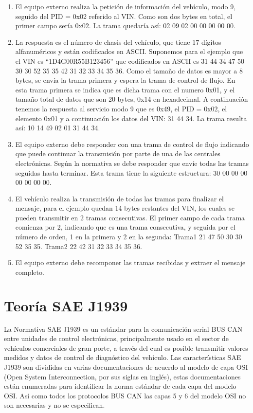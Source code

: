 \begin{enumerate}
\item El equipo externo realiza la petición de información del vehículo, modo 9, seguido del PID = 0x02 referido al VIN. Como son dos bytes en total, el primer campo sería 0x02. La trama quedaría así: 02 09 02 00 00 00 00 00. 
\item La respuesta es el número de chasis del vehículo, que tiene 17 dígitos alfanuméricos y están codificados en ASCII. Suponemos para el ejemplo que el VIN es “1D4G00R55B123456” que codificados en ASCII es 31 44 34 47 50 30 30 52 35 35 42 31 32 33 34 35 36.
Como el tamaño de datos es mayor a 8 bytes, se envía la trama primera y espera la trama de control de flujo. En esta trama primera se indica que es dicha trama con el numero 0x01, y el tamaño total de datos que son 20 bytes, 0x14 en hexadecimal. A continuación tenemos la respuesta al servicio modo 9 que es 0x49, el PID = 0x02, el elemento 0x01 y a continuación los datos del VIN: 31 44 34.
La trama resulta así: 10 14 49 02 01 31 44 34.  
\item El equipo externo debe responder con una trama de control de flujo indicando que puede continuar la transmisión por parte de una de las centrales electrónicas. Según la normativa se debe responder que envíe todas las tramas seguidas hasta terminar. Esta trama tiene la siguiente estructura: 30 00  00 00 00 00 00 00.
\item El vehículo realiza la transmisión de todas las  tramas para finalizar el mensaje, para el ejemplo quedan 14 bytes restantes del VIN, los cuales se pueden transmitir en 2 tramas consecutivas. El primer campo de cada trama comienza por 2, indicando que es una trama consecutiva, y seguida por el número de orden, 1 en la primera y 2 en la segunda:
Trama1 21 47 50 30 30 52 35 35.
Trama2 22 42 31 32 33 34 35 36.
\item El equipo externo debe recomponer las tramas recibidas y extraer el mensaje completo.
\end{enumerate}

\section{Teoría SAE J1939}
La Normativa SAE J1939 es un estándar para la comunicación serial BUS CAN entre unidades de control electrónicas,  principalmente usado en el sector de vehículos comerciales de gran porte, a través del cual es posible transmitir valores medidos y datos de control de diagnóstico del vehículo.
Las características SAE  J1939 son divididas en varias documentaciones de acuerdo al modelo de capa OSI (Open System Interconnection, por sus siglas en inglés),  estas documentaciones están enumeradas para identificar la norma estándar de cada capa del modelo OSI.  Así como todos los protocolos BUS CAN las capas 5 y 6 del modelo OSI no son necesarias y no se especifican. 


